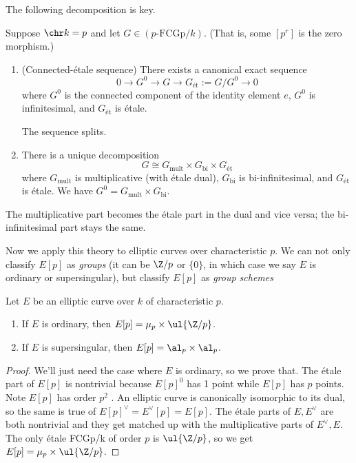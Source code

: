 The following decomposition is key. 
\begin{pr}
Suppose $\chr k=p$ and let $G\in (p\text{-FCGp}/k)$. (That is, some $[p^r]$ is the zero morphism.)
\begin{enumerate}
\item
(Connected-\'etale sequence) 
There exists a canonical exact sequence
\[
0\to G^0 \to G\to G_{\text{\'et}}:=G/G^0\to 0
\]
where $G^0$ is the connected component of the identity element $e$, $G^0$ is infinitesimal, and $G_{\text{\'et}}$ is \'etale.

The sequence splits.
\item
There is a unique decomposition
\[
G\cong G_{\text{mult}}\times G_{\text{bi}}\times G_{\text{\'et}}
\]
where $G_{\text{mult}}$ is multiplicative (with \'etale dual), $G_{\text{bi}}$ is bi-infinitesimal, and $G_{\text{\'et}}$ is \'etale. We have $G^0=G_{\text{mult}}\times G_{\text{bi}}$.
\end{enumerate}
\end{pr}
The multiplicative part becomes the \'etale part in the dual and vice versa; the bi-infinitesimal part stays the same.

Now we apply this theory to elliptic curves over characteristic $p$. We can not only classify $E[p]$ as {\it groups} (it can be $\Z/p$ or $\{0\}$, in which case we say $E$ is ordinary or supersingular), but classify $E[p]$ as {\it group schemes}
\begin{pr}
Let $E$ be an elliptic curve over $k$ of characteristic $p$.
\begin{enumerate}
\item
If $E$ is ordinary, then $E[p]=\mu_p\times \ul{\Z/p}$.
\item
If $E$ is supersingular, then $E[p]=\al_p\times \al_p$.
\end{enumerate}
\end{pr}
\begin{proof}
We'll just need the case where $E$ is ordinary, so we prove that. The \'etale part of $E[p]$ is nontrivial because $E[p]^0$ has 1 point while $E[p]$ has $p$ points. 
Note $E[p]$ has order $p^2$ . An elliptic curve is canonically isomorphic to its dual, so the same is true of $E[p]^{\vee}=E^{\vee}[p]=E[p]$. The \'etale parts of $E,E^{\vee}$ are both nontrivial and they get matched up with the multiplicative parts of $E^{\vee},E$. The only \'etale FCGp/k of order $p$ is $\ul{\Z/p}$, so we get $E[p]=\mu_p\times \ul{\Z/p}$.
\end{proof}



